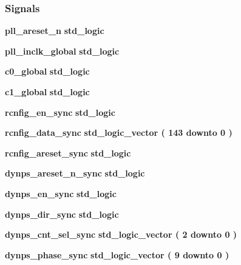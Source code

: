 \subsubsection*{Signals}
 \begin{DoxyCompactItemize}
\item 
{\bf pll\+\_\+areset\+\_\+n} {\bfseries \textcolor{comment}{std\+\_\+logic}\textcolor{vhdlchar}{ }} 
\item 
{\bf pll\+\_\+inclk\+\_\+global} {\bfseries \textcolor{comment}{std\+\_\+logic}\textcolor{vhdlchar}{ }} 
\item 
{\bf c0\+\_\+global} {\bfseries \textcolor{comment}{std\+\_\+logic}\textcolor{vhdlchar}{ }} 
\item 
{\bf c1\+\_\+global} {\bfseries \textcolor{comment}{std\+\_\+logic}\textcolor{vhdlchar}{ }} 
\item 
{\bf rcnfig\+\_\+en\+\_\+sync} {\bfseries \textcolor{comment}{std\+\_\+logic}\textcolor{vhdlchar}{ }} 
\item 
{\bf rcnfig\+\_\+data\+\_\+sync} {\bfseries \textcolor{comment}{std\+\_\+logic\+\_\+vector}\textcolor{vhdlchar}{ }\textcolor{vhdlchar}{(}\textcolor{vhdlchar}{ }\textcolor{vhdlchar}{ } \textcolor{vhdldigit}{143} \textcolor{vhdlchar}{ }\textcolor{keywordflow}{downto}\textcolor{vhdlchar}{ }\textcolor{vhdlchar}{ } \textcolor{vhdldigit}{0} \textcolor{vhdlchar}{ }\textcolor{vhdlchar}{)}\textcolor{vhdlchar}{ }} 
\item 
{\bf rcnfig\+\_\+areset\+\_\+sync} {\bfseries \textcolor{comment}{std\+\_\+logic}\textcolor{vhdlchar}{ }} 
\item 
{\bf dynps\+\_\+areset\+\_\+n\+\_\+sync} {\bfseries \textcolor{comment}{std\+\_\+logic}\textcolor{vhdlchar}{ }} 
\item 
{\bf dynps\+\_\+en\+\_\+sync} {\bfseries \textcolor{comment}{std\+\_\+logic}\textcolor{vhdlchar}{ }} 
\item 
{\bf dynps\+\_\+dir\+\_\+sync} {\bfseries \textcolor{comment}{std\+\_\+logic}\textcolor{vhdlchar}{ }} 
\item 
{\bf dynps\+\_\+cnt\+\_\+sel\+\_\+sync} {\bfseries \textcolor{comment}{std\+\_\+logic\+\_\+vector}\textcolor{vhdlchar}{ }\textcolor{vhdlchar}{(}\textcolor{vhdlchar}{ }\textcolor{vhdlchar}{ } \textcolor{vhdldigit}{2} \textcolor{vhdlchar}{ }\textcolor{keywordflow}{downto}\textcolor{vhdlchar}{ }\textcolor{vhdlchar}{ } \textcolor{vhdldigit}{0} \textcolor{vhdlchar}{ }\textcolor{vhdlchar}{)}\textcolor{vhdlchar}{ }} 
\item 
{\bf dynps\+\_\+phase\+\_\+sync} {\bfseries \textcolor{comment}{std\+\_\+logic\+\_\+vector}\textcolor{vhdlchar}{ }\textcolor{vhdlchar}{(}\textcolor{vhdlchar}{ }\textcolor{vhdlchar}{ } \textcolor{vhdldigit}{9} \textcolor{vhdlchar}{ }\textcolor{keywordflow}{downto}\textcolor{vhdlchar}{ }\textcolor{vhdlchar}{ } \textcolor{vhdldigit}{0} \textcolor{vhdlchar}{ }\textcolor{vhdlchar}{)}\textcolor{vhdlchar}{ }} 

\end{DoxyCompactItemize}
